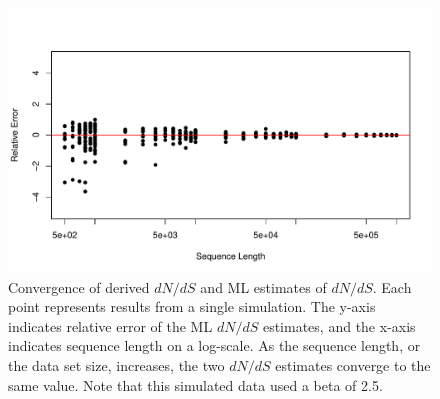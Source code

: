 \documentclass[11pt]{article}
\begin{document}
\begin{figure}[H]
\centerline{\includegraphics[width=6in]{figures/convergence.pdf}}
\caption{\label{conv} Convergence of derived $dN/dS$ and ML estimates of $dN/dS$. Each point represents results from a single simulation. The y-axis indicates relative error of the ML $dN/dS$ estimates, and the x-axis indicates sequence length on a log-scale. As the sequence length, or the data set size, increases, the two $dN/dS$ estimates converge to the same value. Note that this simulated data used a beta of 2.5.}
\end{figure}


	
	
	
\end{document}
